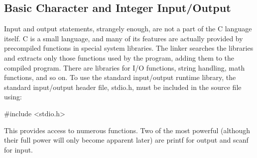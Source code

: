 \subsection{Basic Character and Integer Input/Output}

Input and  output statements,  strangely enough,  are not a part
of the C language itself.  C is a small language, and many of its
features are actually provided by  precompiled functions  in special 
{\kc system  libraries}.  The linker 
searches the libraries and
extracts only those functions used by the program, adding them to the
compiled program.  There  are libraries for  I/O functions, 
string handling,  math functions, and so on. To use the  standard
input/output  runtime  library,  the  standard  input/output header
file, {\fn stdio.h}, must be included in 
the source file using:
\begin{code}
 \#include  <stdio.h>
\end{code}
\noindent
 This provides access  to numerous  functions.  Two of
the most powerful (although their full power will only
become apparent later) are {\cd printf} 
for output and {\cd scanf}
for input.  

